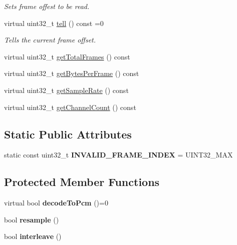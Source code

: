 \begin{DoxyCompactItemize}
\begin{DoxyCompactList}\small\item\em Sets frame offest to be read. \end{DoxyCompactList}\item 
virtual uint32\+\_\+t \hyperlink{classcocos2d_1_1experimental_1_1AudioDecoder_a6c7f6cb06a8eb9e584ff6097a3f37e95}{tell} () const =0
\begin{DoxyCompactList}\small\item\em Tells the current frame offset. \end{DoxyCompactList}\item 
virtual uint32\+\_\+t \hyperlink{classcocos2d_1_1experimental_1_1AudioDecoder_abe5eba8cb631cc4995b8b429be99fb9e}{get\+Total\+Frames} () const
\item 
virtual uint32\+\_\+t \hyperlink{classcocos2d_1_1experimental_1_1AudioDecoder_aaa81e1943e6ec7dec5d376f4a81f54a1}{get\+Bytes\+Per\+Frame} () const
\item 
virtual uint32\+\_\+t \hyperlink{classcocos2d_1_1experimental_1_1AudioDecoder_a368e97749cd9e8521d2f7fdd2a4acd24}{get\+Sample\+Rate} () const
\item 
virtual uint32\+\_\+t \hyperlink{classcocos2d_1_1experimental_1_1AudioDecoder_a395655864535d21d76243c6e7eac1c93}{get\+Channel\+Count} () const
\end{DoxyCompactItemize}
\subsection*{Static Public Attributes}
\begin{DoxyCompactItemize}
\item 
\mbox{\label{classcocos2d_1_1experimental_1_1AudioDecoder_a8e10aaf989eed1e9aa548d62ea833ec3}} 
static const uint32\+\_\+t {\bfseries I\+N\+V\+A\+L\+I\+D\+\_\+\+F\+R\+A\+M\+E\+\_\+\+I\+N\+D\+EX} = U\+I\+N\+T32\+\_\+\+M\+AX
\end{DoxyCompactItemize}
\subsection*{Protected Member Functions}
\begin{DoxyCompactItemize}
\item 
\mbox{\label{classcocos2d_1_1experimental_1_1AudioDecoder_aa307947631e4217c233a4004c9e965d7}} 
virtual bool {\bfseries decode\+To\+Pcm} ()=0
\item 
\mbox{\label{classcocos2d_1_1experimental_1_1AudioDecoder_adbcfaedbaea64bbca4090426b99f1d16}} 
bool {\bfseries resample} ()
\item 
\mbox{\label{classcocos2d_1_1experimental_1_1AudioDecoder_af6b0e4ae190d513944dd975bd5b66c67}} 
bool {\bfseries interleave} ()
\end{DoxyCompactItemize}
